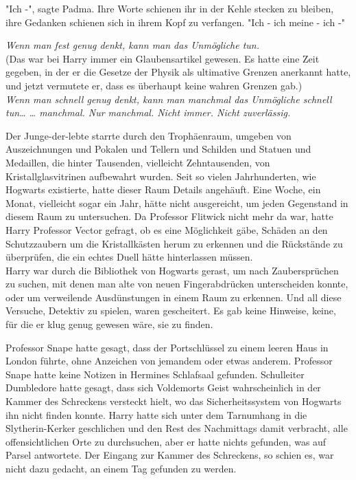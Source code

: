 {"Ich -", sagte Padma. Ihre Worte schienen ihr in der Kehle stecken zu bleiben, ihre Gedanken schienen sich in ihrem Kopf zu verfangen. "Ich - ich meine - ich -"

\emph{Wenn man fest genug denkt, kann man das Unmögliche tun.}\\ (Das war bei Harry immer ein Glaubensartikel gewesen. Es hatte eine Zeit gegeben, in der er die Gesetze der Physik als ultimative Grenzen anerkannt hatte, und jetzt vermutete er, dass es überhaupt keine wahren Grenzen gab.)\\ \emph{Wenn man schnell genug denkt, kann man manchmal das Unmögliche schnell tun… … manchmal. Nur manchmal. Nicht immer. Nicht zuverlässig.}

Der Junge-der-lebte starrte durch den Trophäenraum, umgeben von Auszeichnungen und Pokalen und Tellern und Schilden und Statuen und Medaillen, die hinter Tausenden, vielleicht Zehntausenden, von Kristallglasvitrinen aufbewahrt wurden. Seit so vielen Jahrhunderten, wie Hogwarts existierte, hatte dieser Raum Details angehäuft. Eine Woche, ein Monat, vielleicht sogar ein Jahr, hätte nicht ausgereicht, um jeden Gegenstand in diesem Raum zu untersuchen. Da Professor Flitwick nicht mehr da war, hatte Harry Professor Vector gefragt, ob es eine Möglichkeit gäbe, Schäden an den Schutzzaubern um die Kristallkästen herum zu erkennen und die Rückstände zu überprüfen, die ein echtes Duell hätte hinterlassen müssen.\\ Harry war durch die Bibliothek von Hogwarts gerast, um nach Zaubersprüchen zu suchen, mit denen man alte von neuen Fingerabdrücken unterscheiden konnte, oder um verweilende Ausdünstungen in einem Raum zu erkennen. Und all diese Versuche, Detektiv zu spielen, waren gescheitert. Es gab keine Hinweise, keine, für die er klug genug gewesen wäre, sie zu finden.

Professor Snape hatte gesagt, dass der Portschlüssel zu einem leeren Haus in London führte, ohne Anzeichen von jemandem oder etwas anderem. Professor Snape hatte keine Notizen in Hermines Schlafsaal gefunden. Schulleiter Dumbledore hatte gesagt, dass sich Voldemorts Geist wahrscheinlich in der Kammer des Schreckens versteckt hielt, wo das Sicherheitssystem von Hogwarts ihn nicht finden konnte. Harry hatte sich unter dem Tarnumhang in die Slytherin-Kerker geschlichen und den Rest des Nachmittags damit verbracht, alle offensichtlichen Orte zu durchsuchen, aber er hatte nichts gefunden, was auf Parsel antwortete. Der Eingang zur Kammer des Schreckens, so schien es, war nicht dazu gedacht, an einem Tag gefunden zu werden.

}
